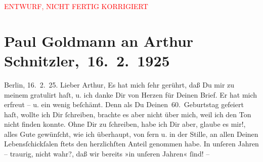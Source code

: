 
\begin{center}
            \textcolor{red}{ENTWURF, NICHT FERTIG KORRIGIERT}
                      \end{center}
            
         \renewcommand{\erwaehnteInstitutionen}{Institutionen: S. Fischer Verlag}
         \renewcommand{\erwaehnteOrte}{Orte: Berlin, Wien}
         \renewcommand{\erwaehnteWerke}{Werke: Berliner Theater. (»Der Schleier der Beatrice« von Arthur Schnitzler.), Der Schleier der Beatrice. Schauspiel in fünf Akten, Komödie der Worte. Drei Einakter, Lebendige Stunden. Vier Einakter, Neue Freie Presse, Stunde des Erkennens, Tagebuch}
               \section[ Paul Goldmann an Arthur Schnitzler, 16. 2. 1925]{ Paul Goldmann an Arthur Schnitzler, 16. 2. 1925}\nopagebreak{}\rehead{ }\begin{ledgroupsized}[t]{13cm}\normalsize\beginnumbering \toendnotes[C]{\smallbreak\pagebreak[2]} 
\toendnotes[C]{\smallbreak}\pstart
           {\pb}Berlin, 16. 2. 25.\pend
           \pstart{}Lieber Arthur,\pend\pstart
           Es hat mich ſehr gerührt, daß Du mir zu meinem \label{K_L03478-1v}\label{K_L03478-1h} gratulirt haſt, u. ich danke Dir von Herzen für Deinen Brief. Er hat mich
               erfreut – u. ein wenig beſchämt. Denn als Du \label{K_L03478-2v}\label{K_L03478-2h} Deinen 60. Geburtstag gefeiert haſt, wollte ich Dir ſchreiben, brachte es
               aber nicht über mich, weil ich den Ton nicht finden konnte. Ohne Dir zu ſchreiben,
               habe ich Dir aber, glaube es mir!, alles Gute gewünſcht, wie ich überhaupt, von fern
                  {\pb}u. in 
               der Stille, an allen Deinen Lebensſchickſalen ftets den herzlichſten Anteil genommen
               habe.\pend
           \pstart
           In unſeren Jahren – traurig, nicht wahr?, daß wir bereits »in unſeren Jahren« ſind! –

\end{ledgroupsized}
